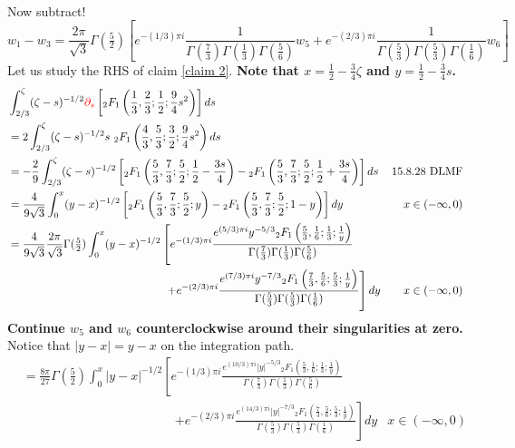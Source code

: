 \documentclass[11pt,a4paper,twoside,leqno,noamsfonts]{amsart}
\numberwithin{equation}{section}
\begin{document}
\begin{example}[Airy]
\begin{align*}
\end{align*}
Now subtract!
\[ w_1 - w_3 = \frac{2\pi}{\sqrt{3}} \Gamma(\tfrac{5}{2}) \left[ e^{-(1/3) \pi i} \frac{1}{\Gamma(\tfrac{7}{3}) \Gamma(\tfrac{1}{3}) \Gamma(\tfrac{5}{6})} w_5 + e^{-(2/3) \pi i} \frac{1}{\Gamma(\tfrac{5}{3}) \Gamma(\tfrac{5}{3}) \Gamma(\tfrac{1}{6})} w_6 \right] \]
\color{MidnightBlue}
Let us study the RHS of claim \eqref{claim 2}. \textbf{Note that $x = \tfrac{1}{2} - \tfrac{3}{4} \zeta$ and $y = \tfrac{1}{2} - \tfrac{3}{4} s$.
\begin{align*}
&\int_{2/3}^{\zeta}(\zeta-s)^{-1/2}\textcolor{red}{\partial_s}\left[{}_2F_1\left(\frac{1}{3},\frac{2}{3};\frac{1}{2};\frac{9}{4}s^2\right)\right]ds \\
&= 2\int_{2/3}^{\zeta} (\zeta-s)^{-1/2}s\,\,{}_2F_1\left(\frac{4}{3},\frac{5}{3};\frac{3}{2};\frac{9}{4}s^2\right)ds & \\
&= -\frac{2}{9} \int_{2/3}^{\zeta} (\zeta-s)^{-1/2} \left[ {}_2F_1\left(\frac{5}{3},\frac{7}{3};\frac{5}{2};\frac{1}{2}-\frac{3s}{4}\right) - {}_2F_1\left(\frac{5}{3},\frac{7}{3};\frac{5}{2};\frac{1}{2}+\frac{3s}{4}\right) \right] ds & 15.8.28 \text{ DLMF} \\
&=\frac{4}{9\sqrt{3}}\int_0^x (y-x)^{-1/2}\left[{}_2F_1\left(\frac{5}{3},\frac{7}{3};\frac{5}{2};y\right)-{}_2F_1\left(\frac{5}{3},\frac{7}{3};\frac{5}{2};1-y\right)\right]dy & x\in (-\infty,0) \\
&=\frac{4}{9\sqrt{3}} \frac{2\pi}{\sqrt{3}} \Gamma(\tfrac{5}{2}) \int_0^x (y-x)^{-1/2}\left[ e^{-(1/3) \pi i} \frac{e^{(5/3) \pi i} y^{-5/3} {}_2F_1\left(\frac{5}{3},\frac{1}{6};\frac{1}{3};\frac{1}{y}\right)}{\Gamma(\tfrac{7}{3}) \Gamma(\tfrac{1}{3}) \Gamma(\tfrac{5}{6})} \right. \\
& \qquad\qquad\qquad\qquad\qquad\qquad\qquad \left. + e^{-(2/3) \pi i} \frac{e^{(7/3) \pi i} y^{-7/3} {}_2F_1\left(\frac{7}{3},\frac{5}{6};\frac{5}{3};\frac{1}{y}\right)}{\Gamma(\tfrac{5}{3}) \Gamma(\tfrac{5}{3}) \Gamma(\tfrac{1}{6})} \right]dy & x\in (-\infty,0)
\end{align*}
Continue $w_5$ and $w_6$ counterclockwise around their singularities at zero.} Notice that $|y - x| = y - x$ on the integration path.
\begin{align*}
&=\frac{8\pi}{27} \Gamma(\tfrac{5}{2}) \int_0^x |y-x|^{-1/2}\left[ e^{-(1/3) \pi i} \frac{e^{(10/3) \pi i} |y|^{-5/3} {}_2F_1\left(\frac{5}{3},\frac{1}{6};\frac{1}{3};\frac{1}{y}\right)}{\Gamma(\tfrac{7}{3}) \Gamma(\tfrac{1}{3}) \Gamma(\tfrac{5}{6})} \right. \\
& \qquad\qquad\qquad\qquad\qquad\qquad \left. + e^{-(2/3) \pi i} \frac{e^{(14/3) \pi i} |y|^{-7/3} {}_2F_1\left(\frac{7}{3},\frac{5}{6};\frac{5}{3};\frac{1}{y}\right)}{\Gamma(\tfrac{5}{3}) \Gamma(\tfrac{5}{3}) \Gamma(\tfrac{1}{6})} \right]dy & x\in (-\infty,0) \\

\end{align*}
\end{example}
\end{document}
